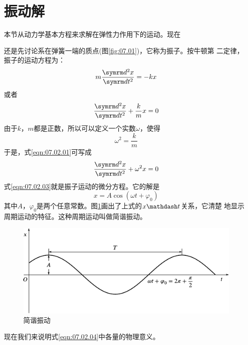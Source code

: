 \section{振动解}\label{sec:07.02}

本节从动力学基本方程来求解在弹性力作用下的运动。现在

\noindent
还是先讨论系在弹簧一端的质点(图\ref{fig:07.01})，它称为振子。按牛顿第
二定律，振子的运动方程为：
\begin{equation*}
  m \frac { \dif ^ { 2 } x } { \dif t ^ { 2 } } = - k x
\end{equation*}
或者
\begin{equation}\label{eqn:07.02.01}
  \frac { \dif ^ { 2 } x } { \dif t ^ { 2 } } + \frac { k } { m } x = 0
\end{equation}
由于$ k $，$ m $都是正数，所以可以定义一个实数$ \omega $，使得
\begin{equation}\label{eqn:07.02.02}
  \omega ^ { 2 } = \frac { k } { m }
\end{equation}
于是，式\eqref{eqn:07.02.01}可写成
\begin{equation}\label{eqn:07.02.03}
  \frac { \dif ^ { 2 } x } { \dif t ^ { 2 } } + \omega ^ { 2 } x = 0
\end{equation}
式\eqref{eqn:07.02.03}就是振子运动的微分方程。它的解是
\begin{equation}\label{eqn:07.02.04}
  x = A \cos \left( \omega t + \varphi _ { 0 } \right)
\end{equation}
其中$ A $，$ \varphi _ { 0 } $是两个任意常数。图\ref{fig:07.05}\;画出了上式的$ x \mathdash t $关系，它清楚
地显示周期运动的特征。这种周期运动叫做简谐振动。
\begin{figure}[h]
  \vspace{1em}
  \centering
  \includegraphics{figure/fig07.05}
  \caption{简谐振动}
  \label{fig:07.05}
\end{figure}

现在我们来说明式\eqref{eqn:07.02.04}中各量的物理意义。

